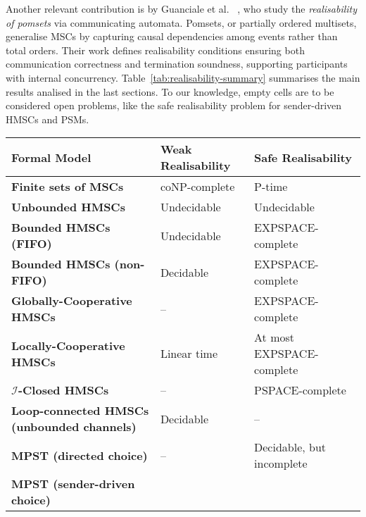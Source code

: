 Another relevant contribution is by Guanciale et al.~ 
\cite{DBLP:journals/jlap/GuancialeT19}, who study the 
\emph{realisability of pomsets} via communicating automata. 
Pomsets, or partially ordered multisets, generalise MSCs by 
capturing causal dependencies among events rather than total 
orders. Their work defines realisability conditions ensuring 
both communication correctness and termination soundness, 
supporting participants with internal concurrency.
Table~\ref{tab:realisability-summary} summarises the 
main results analised in the last sections. To our knowledge, 
empty cells are to be considered open problems, like
the safe realisability problem for sender-driven HMSCs
and PSMs.

\bigskip

\begin{table}[!ht]
\centering
\renewcommand{\arraystretch}{1.3}
\begin{tabular}{|p{4.3cm}|p{4.3cm}|p{4.3cm}|}
\hline
\textbf{Formal Model} & \textbf{Weak Realisability} & \textbf{Safe Realisability} \\ 
\hline
\textbf{Finite sets of MSCs} 
& coNP-complete~\cite{alur2005realizability} 
& P-time~\cite{alur2005realizability} \\ 
\hline
\textbf{Unbounded HMSCs} 
& Undecidable~\cite{lohrey2003realizability} 
& Undecidable~\cite{lohrey2003realizability} \\ 
\hline
\textbf{Bounded HMSCs (FIFO)} 
& Undecidable~\cite{alur2005realizability} 
& EXPSPACE-complete~\cite{lohrey2003realizability} \\ 
\hline
\textbf{Bounded HMSCs (non-FIFO)} 
& Decidable~\cite{morin2002recognizable} 
& EXPSPACE-complete~\cite{lohrey2003realizability} \\ 
\hline
\textbf{Globally-Cooperative HMSCs} 
& -- 
& EXPSPACE-complete~\cite{morin2002recognizable} \\ 
\hline
\textbf{Locally-Cooperative HMSCs} 
& Linear time~\cite{genest2006infinite}
& At most EXPSPACE-complete~\cite{morin2002recognizable}  \\ 
\hline
\textbf{$\mathcal{I}$-Closed HMSCs} 
& -- 
& PSPACE-complete~\cite{lohrey2003realizability} \\ 
\hline
\textbf{Loop-connected HMSCs (unbounded channels)} 
& Decidable~\cite{bollig2025high}
& -- \\ 
\hline
\textbf{MPST (directed choice)} 
& --
& Decidable, but incomplete~\cite{honda2008multiparty} \\ 
\hline
\textbf{MPST (sender-driven choice)} 

\end{tabular}
\end{table}
